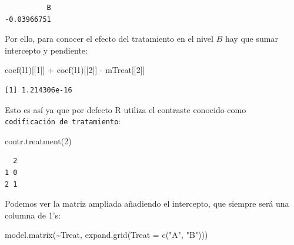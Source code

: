 \documentclass[
  12pt,
  a4paper,
  extrafontsizes,
  onecolumn,
  openright,
  table]{memoir}
\newenvironment{Shaded}{\begin{snugshade}}{\end{snugshade}}
\newcommand{\AttributeTok}[1]{\textcolor[rgb]{0.40,0.45,0.13}{#1}}
\newcommand{\DecValTok}[1]{\textcolor[rgb]{0.68,0.00,0.00}{#1}}
\newcommand{\FunctionTok}[1]{\textcolor[rgb]{0.28,0.35,0.67}{#1}}
\newcommand{\NormalTok}[1]{\textcolor[rgb]{0.00,0.23,0.31}{#1}}
\newcommand{\SpecialCharTok}[1]{\textcolor[rgb]{0.37,0.37,0.37}{#1}}
\newcommand{\StringTok}[1]{\textcolor[rgb]{0.13,0.47,0.30}{#1}}
\begin{document}
\begin{verbatim}
          B 
-0.03966751 
\end{verbatim}

\normalsize

Por ello, para conocer el efecto del tratamiento en el nivel \(B\) hay
que sumar intercepto y pendiente:

\scriptsize

\begin{Shaded}
\begin{Highlighting}[]
\FunctionTok{coef}\NormalTok{(l1)[[}\DecValTok{1}\NormalTok{]] }\SpecialCharTok{+} \FunctionTok{coef}\NormalTok{(l1)[[}\DecValTok{2}\NormalTok{]] }\SpecialCharTok{{-}}\NormalTok{ mTreat[[}\DecValTok{2}\NormalTok{]]}
\end{Highlighting}
\end{Shaded}

\begin{verbatim}
[1] 1.214306e-16
\end{verbatim}

\normalsize

Esto es así ya que por defecto R utiliza el contraste conocido como
\texttt{codificación\ de\ tratamiento}:

\scriptsize

\begin{Shaded}
\begin{Highlighting}[]
\FunctionTok{contr.treatment}\NormalTok{(}\DecValTok{2}\NormalTok{)}
\end{Highlighting}
\end{Shaded}

\begin{verbatim}
  2
1 0
2 1
\end{verbatim}

\normalsize

Podemos ver la matriz ampliada añadiendo el intercepto, que siempre será
una columna de 1's:

\scriptsize

\begin{Shaded}
\begin{Highlighting}[]
\FunctionTok{model.matrix}\NormalTok{(}\SpecialCharTok{\textasciitilde{}}\NormalTok{Treat, }\FunctionTok{expand.grid}\NormalTok{(}\AttributeTok{Treat =} \FunctionTok{c}\NormalTok{(}\StringTok{"A"}\NormalTok{, }\StringTok{"B"}\NormalTok{)))}
\end{Highlighting}
\end{Shaded}
\end{document}
